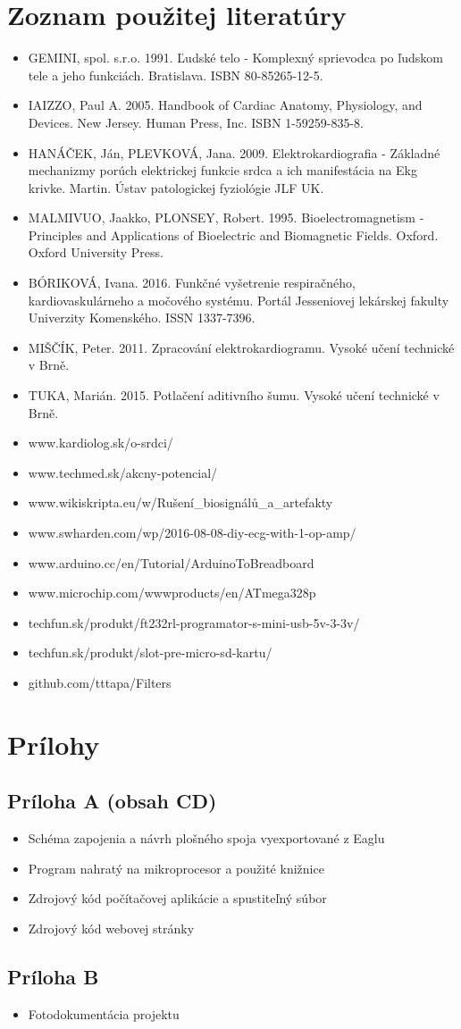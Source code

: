 \documentclass[titlepage,12pt]{article}
\begin{document}
\section{Zoznam použitej literatúry}
\begin{itemize}
\item GEMINI, spol. s.r.o. 1991. Ľudské telo - Komplexný sprievodca po ľudskom tele a jeho funkciách. Bratislava. ISBN 80-85265-12-5.
\item IAIZZO, Paul A. 2005. Handbook of Cardiac Anatomy, Physiology, and Devices. New Jersey. Human Press, Inc. ISBN 1-59259-835-8.
\item HANÁČEK, Ján, PLEVKOVÁ, Jana. 2009. Elektrokardiografia - Základné mechanizmy porúch elektrickej funkcie srdca a ich manifestácia na Ekg krivke. Martin. Ústav patologickej fyziológie JLF UK.
\item MALMIVUO, Jaakko, PLONSEY, Robert. 1995. Bioelectromagnetism - Principles and Applications of Bioelectric and Biomagnetic Fields. Oxford. Oxford University Press.
\item BÓRIKOVÁ, Ivana. 2016. Funkčné vyšetrenie respiračného, kardiovaskulárneho a močového systému. Portál Jesseniovej lekárskej fakulty Univerzity Komenského. ISSN 1337-7396.
\item MIŠČÍK, Peter. 2011. Zpracování elektrokardiogramu. Vysoké učení technické v Brně. 
\item TUKA, Marián. 2015. Potlačení aditivního šumu. Vysoké učení technické v Brně. 
\item www.kardiolog.sk/o-srdci/
\item www.techmed.sk/akcny-potencial/
\item www.wikiskripta.eu/w/Rušení\_biosignálů\_a\_artefakty
\item www.swharden.com/wp/2016-08-08-diy-ecg-with-1-op-amp/
\item www.arduino.cc/en/Tutorial/ArduinoToBreadboard
\item www.microchip.com/wwwproducts/en/ATmega328p
\item techfun.sk/produkt/ft232rl-programator-s-mini-usb-5v-3-3v/
\item techfun.sk/produkt/slot-pre-micro-sd-kartu/
\item github.com/tttapa/Filters
\end{itemize}

\newpage
\section{Prílohy}
\subsection*{Príloha A (obsah CD)}
\begin{itemize}
	\item Schéma zapojenia a návrh plošného spoja vyexportované z Eaglu
	\item Program nahratý na mikroprocesor a použité knižnice
	\item Zdrojový kód počítačovej aplikácie a spustiteľný súbor
	\item Zdrojový kód webovej stránky
\end{itemize}
\subsection*{Príloha B}
\begin{itemize}
	\item Fotodokumentácia projektu
\end{itemize}
\end{document}
